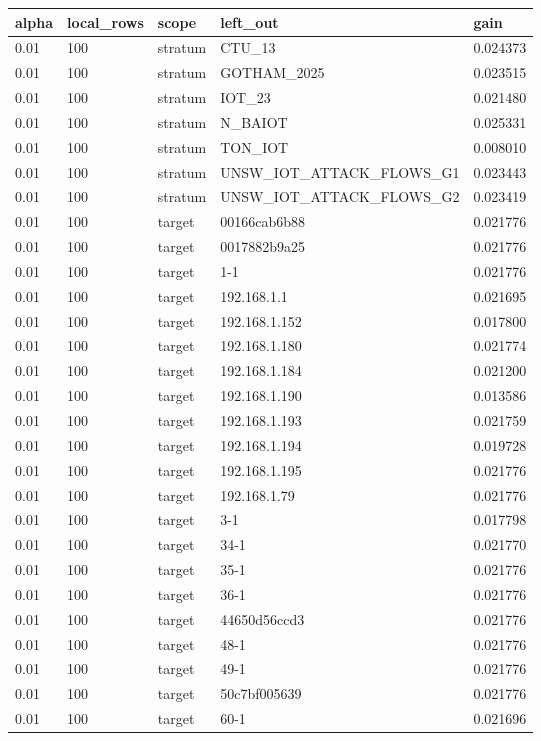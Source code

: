 \begin{tabular}{lllll}
\toprule
alpha & local\_rows & scope & left\_out & gain \\
\midrule
0.01 & 100 & stratum & CTU\_13 & 0.024373 \\
0.01 & 100 & stratum & GOTHAM\_2025 & 0.023515 \\
0.01 & 100 & stratum & IOT\_23 & 0.021480 \\
0.01 & 100 & stratum & N\_BAIOT & 0.025331 \\
0.01 & 100 & stratum & TON\_IOT & 0.008010 \\
0.01 & 100 & stratum & UNSW\_IOT\_ATTACK\_FLOWS\_G1 & 0.023443 \\
0.01 & 100 & stratum & UNSW\_IOT\_ATTACK\_FLOWS\_G2 & 0.023419 \\
0.01 & 100 & target & 00166cab6b88 & 0.021776 \\
0.01 & 100 & target & 0017882b9a25 & 0.021776 \\
0.01 & 100 & target & 1-1 & 0.021776 \\
0.01 & 100 & target & 192.168.1.1 & 0.021695 \\
0.01 & 100 & target & 192.168.1.152 & 0.017800 \\
0.01 & 100 & target & 192.168.1.180 & 0.021774 \\
0.01 & 100 & target & 192.168.1.184 & 0.021200 \\
0.01 & 100 & target & 192.168.1.190 & 0.013586 \\
0.01 & 100 & target & 192.168.1.193 & 0.021759 \\
0.01 & 100 & target & 192.168.1.194 & 0.019728 \\
0.01 & 100 & target & 192.168.1.195 & 0.021776 \\
0.01 & 100 & target & 192.168.1.79 & 0.021776 \\
0.01 & 100 & target & 3-1 & 0.017798 \\
0.01 & 100 & target & 34-1 & 0.021770 \\
0.01 & 100 & target & 35-1 & 0.021776 \\
0.01 & 100 & target & 36-1 & 0.021776 \\
0.01 & 100 & target & 44650d56ccd3 & 0.021776 \\
0.01 & 100 & target & 48-1 & 0.021776 \\
0.01 & 100 & target & 49-1 & 0.021776 \\
0.01 & 100 & target & 50c7bf005639 & 0.021776 \\
0.01 & 100 & target & 60-1 & 0.021696 \\

\end{tabular}
